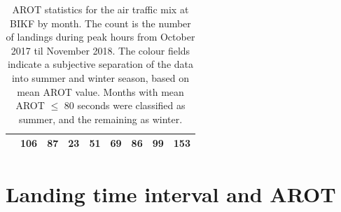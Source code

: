 \begin{table}[h]
{\begin{tabular}{lr|r|r|r|r|r|r|r|}
\rowcolor[HTML]{DAE8FC} 
\multicolumn{1}{|l|}{\cellcolor[HTML]{DAE8FC}December} & 106 & 87 & 23 & 51 & 69 & 86 & 99 & 153 \\ \hline
\end{tabular}%
}
\caption[AROTs for the air traffic mix by month]{AROT statistics for the air traffic mix at BIKF by month. The count is the number of landings during peak hours from October 2017 til November 2018. The colour fields indicate a subjective separation of the data into summer and winter season, based on mean AROT value. Months with mean AROT $\leq$ 80 seconds were classified as summer, and the remaining as winter.}
\label{tab:month2season_arot}
\end{table}

\clearpage
\chapter{Landing time interval and AROT}\label{app:lti_and_arot}



\begin{table}[h]
\centering
{}
\caption[RECAT-EU time-based separation minima]{RECAT-EU WT time-based separation minima on approach and departure~\cite{rooseleer2015recat}}
\label{tab:RECAT-time}
\end{table}





